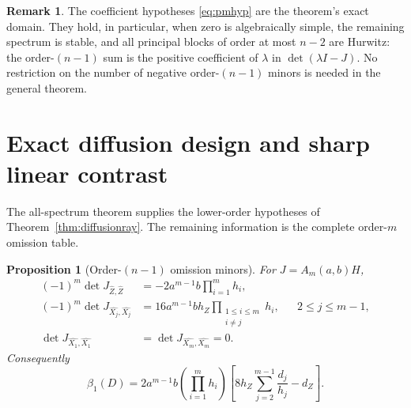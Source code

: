 \documentclass[11pt]{article}
\newtheorem{proposition}[theorem]{Proposition}
\theoremstyle{definition}
\newtheorem{remark}[theorem]{Remark}
\newcommand{\1}{\mathbf 1}
\begin{document}
\begin{remark}\label{rem:spectralhyp}
The coefficient hypotheses \eqref{eq:pmhyp} are the theorem's exact domain.
They hold, in particular, when zero is algebraically simple, the remaining
spectrum is stable, and all principal blocks of order at most $n-2$ are
Hurwitz: the order-$(n-1)$ sum is the positive coefficient of $\lambda$ in
$\det(\lambda I-J)$.  No restriction on the number of negative
order-$(n-1)$ minors is needed in the general theorem.
\end{remark}

\section{Exact diffusion design and sharp linear contrast}

The all-spectrum theorem supplies the lower-order hypotheses of
Theorem~\ref{thm:diffusionray}.  The remaining information is the complete order-$m$
omission table.

\begin{proposition}[Order-$(n-1)$ omission minors]\label{prop:omissions}
For $J=A_m(a,b)H$,
\begin{align}
(-1)^m\det J_{\widehat Z,\widehat Z}
 &=-2a^{m-1}b\prod_{i=1}^m h_i,\label{eq:omitZ}\\
(-1)^m\det J_{\widehat{X_j},\widehat{X_j}}
 &=16a^{m-1}bh_Z
   \prod_{\substack{1\le i\le m\\i\ne j}}h_i,
 &&2\le j\le m-1,\label{eq:omitj}\\
\det J_{\widehat{X_1},\widehat{X_1}}
 &=\det J_{\widehat{X_m},\widehat{X_m}}=0.\label{eq:omitzero}
\end{align}
Consequently
\begin{equation}\label{eq:betaone}
 \beta_1(D)=2a^{m-1}b\left(\prod_{i=1}^mh_i\right)
 \left[8h_Z\sum_{j=2}^{m-1}\frac{d_j}{h_j}-d_Z\right].
\end{equation}
\end{proposition}
\end{document}
